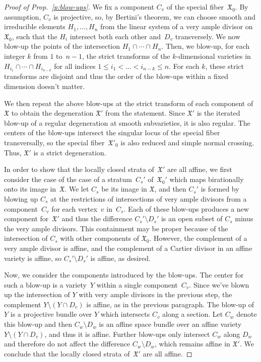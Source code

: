 \documentclass[11pt]{amsart}
\theoremstyle{definition}
\newcommand{\X}{\mathfrak X}
\begin{document}
\begin{proof}[Proof of Prop.~\ref{p:blow-ups}]
We fix a component $C_v$ of the special fiber~$\X_0$.
By assumption, $C_v$ is projective, so, by Bertini's theorem, we can
choose smooth and irreducible elements $H_1, \ldots, H_n$ from the linear system
of a very ample divisor on~$\X_0$, such that the $H_i$ intersect both each other
and~$D_v$ transversely. We now blow-up the points of the intersection $H_1 \cap
\cdots \cap H_n$. Then, we blow-up, for each integer $k$ from $1$ to~$n-1$, the
strict transforms of the $k$-dimensional varieties in $H_{i_1} \cap \cdots \cap
H_{i_{n-k}}$ for all indices $1 \leq i_1 <  \ldots < i_{n-k} \leq n$. For each
$k$, these strict transforms are disjoint and thus the order of the blow-ups
within a fixed dimension doesn't matter.

We then repeat the above blow-ups at the strict transform of each component of
$\X$ to obtain the degeneration $\X'$ from the statement. Since $\X'$ is the
iterated blow-up of a regular degeneration at smooth subvarieties, it
is also regular. The centers of the blow-ups intersect the singular locus of the
special fiber transversally, so the special fiber~$\X'_0$ is also reduced and
simple normal crossing. Thus, $\X'$ is a strict degeneration.

In order to show that the locally closed strata of~$\X'$ are all affine, we
first consider the case of the case of a stratum~$C_s'$ of~$\X_0'$ which maps
birationally onto its image in~$\X$. We let $C_s$ be its image in $\X$, and then
$C_s'$ is formed by blowing up $C_s$ at the restrictions of intersections of
very ample divisors from a component~$C_v$ for each vertex~$v$ in~$C_s$. Each of
these blow-ups produces a new component for~$\X'$ and thus the difference $C_s'
\setminus D_s'$ is an open subset of $C_s$ minus the very ample divisors. This
containment may be proper because of the intersection of $C_s$ with other
components of $\X_0$. However, the complement of a very ample divisor is affine,
and the complement of a Cartier divisor in an affine variety is affine, so $C_s'
\setminus D_s'$ is affine, as desired.

Now, we consider the components introduced by the blow-ups. The center for such
a blow-up is a variety~$Y$ within a single component~$C_v$. Since we've blown up
the intersection of $Y$ with very ample divisors in the previous step, the
complement $Y \setminus (Y \cap D_v)$ is affine, as in the previous paragraph.
The blow-up of $Y$ is a projective bundle over $Y$ which intersects $C_v$ along
a section. Let $C_w$ denote this blow-up and then $C_w \setminus D_w$ is an
affine space bundle over an affine variety $Y \setminus (Y \cap D_v)$, and thus
it is affine. Further blow-ups only intersect $C_w$ along $D_w$ and therefore do
not affect the difference $C_w \setminus D_w$, which remains affine in $\X'$. We
conclude that the locally closed strata of~$\X'$ are all affine.
\end{proof}
\end{document}
